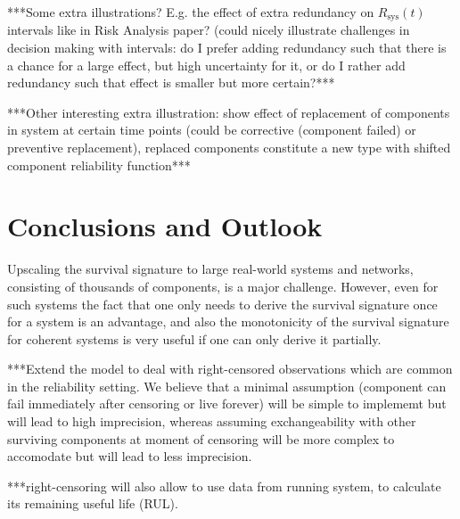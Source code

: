 \documentclass[12pt, a4paper]{elsarticle}
\newcommand{\Rsys}{R_\text{sys}}
\begin{document}


***Some extra illustrations? E.g. the effect of extra redundancy on $\Rsys(t)$ intervals like in Risk Analysis paper?
(could nicely illustrate challenges in decision making with intervals:
do I prefer adding redundancy such that there is a chance for a large effect, but high uncertainty for it,
or do I rather add redundancy such that effect is smaller but more certain?***

***Other interesting extra illustration:
show effect of replacement of components in system at certain time points
(could be corrective (component failed) or preventive replacement),
replaced components constitute a new type with shifted component reliability function***


\section{Conclusions and Outlook}

Upscaling the survival signature to large real-world systems and networks, consisting of thousands of components, is a major challenge.
However, even for such systems the fact that one only needs to derive the survival signature once for a system is an advantage,
and also the monotonicity of the survival signature for coherent systems is very useful if one can only derive it partially.  


***Extend the model to deal with right-censored observations which are common in the reliability setting.
We believe that a minimal assumption (component can fail immediately after censoring or live forever)
will be simple to implememt but will lead to high imprecision,
whereas assuming exchangeability with other surviving components at moment of censoring
will be more complex to accomodate but will lead to less imprecision.

***right-censoring will also allow to use data from running system,
to calculate its remaining useful life (RUL).
\end{document}
